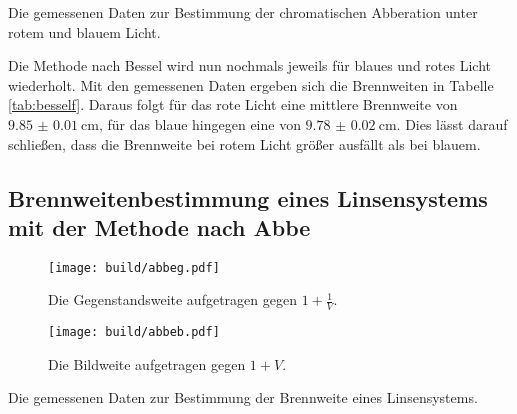  \begin{table}
 	\centering
 	\caption{Die gemessenen Daten zur Bestimmung der chromatischen Abberation unter rotem und blauem Licht.}
 	
 	\label{tab:besself}
 \end{table}

Die Methode nach Bessel wird nun nochmals jeweils für blaues und rotes Licht wiederholt. Mit den gemessenen Daten ergeben sich die Brennweiten in Tabelle \ref{tab:besself}. Daraus folgt für das rote Licht eine mittlere Brennweite von $\SI{9.85(1)}{\centi\meter}$, für das blaue hingegen eine von $\SI{9.78(2)}{\centi\meter}$. Dies lässt darauf schließen, dass die Brennweite bei rotem Licht größer ausfällt als bei blauem.


\subsection{Brennweitenbestimmung eines Linsensystems mit der Methode nach Abbe}

\begin{figure}
 \centering
 \texttt{[image: build/abbeg.pdf]}
 \caption{Die Gegenstandsweite aufgetragen gegen $1+\frac{1}{V}$.}
 \label{fig:abbeg}
\end{figure}

\begin{figure}
 \centering
 \texttt{[image: build/abbeb.pdf]}
 \caption{Die Bildweite aufgetragen gegen $1+V$.}
 \label{fig:abbeb}
\end{figure}


\begin{table}
 \centering
 \caption{Die gemessenen Daten zur Bestimmung der Brennweite eines Linsensystems.}
 
 \label{tab:abbe}
\end{table}


